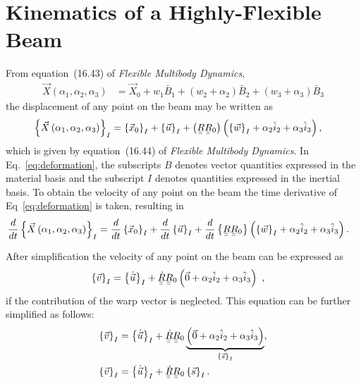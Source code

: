 \documentclass[a4paper]{article}
\newcommand{\ubar}[1]{\underaccent{\bar}{#1}}
\begin{document}
\section*{Kinematics of a Highly-Flexible Beam}

From equation~(16.43) of \textit{Flexible Multibody Dynamics}, \begin{align}
  \vec{X}\left( \alpha_{1}, \alpha_{2}, \alpha_{3} \right)  
  &= \vec{X}_{0} + w_{1}\bar{B}_{1} + \left( w_{2} + \alpha_{2} \right)\bar{B}_{2}
  + \left( w_{3} + \alpha_{3} \right)\bar{B}_{3}
  \label{eq:1643}
\end{align}
the displacement of any point on the beam may be written as 
\begin{align}
  \left\{ \vec{X}\left( \alpha_{1}, \alpha_{2}, \alpha_{3} \right) \right\}_{I}  
  &= \left\{ \vec{x}_{0} \right\}_{I} 
  + \left\{ \vec{u} \right\}_{I} 
  + \left( \ubar{\ubar{R}} \ubar{\ubar{R}}_{0} \right) 
  \left( \left\{ \vec{w} \right\}_{I} + \alpha_{2} \hat{i}_{2} + \alpha_{3} \hat{i}_{3} \right),
  \label{eq:deformation}
\end{align}
which is given by equation~(16.44) of \textit{Flexible Multibody Dynamics}.  In Eq.~\eqref{eq:deformation}, the subscripts $B$ denotes vector quantities expressed in the material basis and the subscript $I$ denotes quantities expressed in the inertial basis.  To obtain the velocity of any point on the beam the time derivative of Eq~\eqref{eq:deformation} is taken, resulting in
\begin{align}
  \frac{d}{dt}\left\{ \vec{X}\left( \alpha_{1}, \alpha_{2}, \alpha_{3} \right) \right\}_{I}  
  &= \frac{d}{dt} \left\{ \vec{x}_{0} \right\}_{I} 
  + \frac{d}{dt} \left\{ \vec{u} \right\}_{I} 
  + \frac{d}{dt} \left\{ \ubar{\ubar{R}} \ubar{\ubar{R}}_{0} \right\}
  \left( \left\{ \vec{w} \right\}_{I} + \alpha_{2} \hat{i}_{2} + \alpha_{3} \hat{i}_{3} \right).
  \label{eq:DdefDt}
\end{align}

After simplification the velocity of any point on the beam can be expressed as  
\begin{align}
  \left\{ \vec{v} \right\}_{I} 
  &= \left\{ \dot{ \vec{u}}\right\}_{I} 
  + \ubar{\ubar{\dot{R}}}\ubar{\ubar{R}}_{0} 
  \left( \vec{0} + \alpha_{2} \hat{i}_{2} + \alpha_{3} \hat{i}_{3} \right) \ ,
\end{align}
if the contribution of the warp vector is neglected.  This equation can be further simplified as follows: 
\begin{align}
  \left\{ \vec{v} \right\}_{I}  
  &= \left\{ \dot{ \vec{u}}\right\}_{I} 
  +  \ubar{\ubar{\dot{R}}} \ubar{\ubar{R}}_{0} 
  \underbrace{\left( \vec{0} + \alpha_{2} \hat{i}_{2} 
  + \alpha_{3} \hat{i}_{3} \right)}_{\left\{ \vec{s} \right\}_{I}}, \\
  \left\{ \vec{v} \right\}_{I} 
  &=  \left\{ \dot{ \vec{u}}\right\}_{I} 
  +  \ubar{\ubar{\dot{R}}} \ubar{\ubar{R}}_{0} \left\{ \vec{s} \right\}_{I}.
  \label{eq:velocity1}
\end{align}
\end{document}
